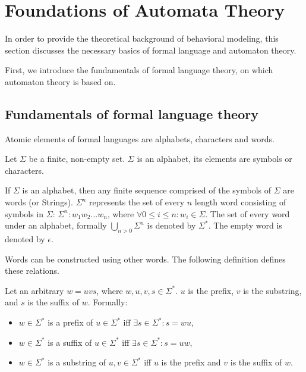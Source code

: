 \section{Foundations of Automata Theory} \label{sec_backgrmodeling}






In order to provide the theoretical background of behavioral modeling, this section discusses the necessary basics of formal language and automaton theory.


First, we introduce the fundamentals of formal language theory, on which automaton theory is based on. 

\subsection{Fundamentals of formal language theory}
Atomic elements of formal languages are alphabets, characters and words.

\begin{definition}[Alphabet]
	Let $\Sigma$ be a finite, non-empty set. $\Sigma$ is an alphabet, its elements are symbols or characters.
\end{definition}

\begin{definition}[Word]
	If $\Sigma$ is an alphabet, then any finite sequence comprised of the symbols of $\Sigma$ are words (or Strings). $\Sigma^{n}$ represents the set of every $n$ length word consisting of symbols in $\Sigma$: $\Sigma^{n}: w_1w_2\ldots w_n$, where $\forall 0 \leq i \leq n: w_i \in \Sigma$. The set of every word under an alphabet, formally $\bigcup\limits_{n>0}^{} \Sigma^{n}$ is denoted by $\Sigma^{*}$. The empty word is denoted by $\epsilon$.
\end{definition}

Words can be constructed using other words. The following definition defines these relations.

\begin{definition}
	Let an arbitrary $w = uvs$, where $w, u, v, s\in\Sigma^*$. $u$ is the prefix, $v$ is the substring, and $s$ is the suffix of $w$. Formally:
	\begin{itemize}
		\item $w\in\Sigma^*$ is a prefix of $u\in\Sigma^*$ iff $\exists s\in\Sigma^*: s=wu$,
		\item $w\in\Sigma^*$ is a suffix of $u\in\Sigma^*$ iff $\exists s\in\Sigma^*: s=uw$,
		\item $w\in\Sigma^*$ is a substring of $u, v\in\Sigma^*$ iff $u$ is the prefix and $v$ is the suffix of $w$.
	\end{itemize}
\end{definition}

